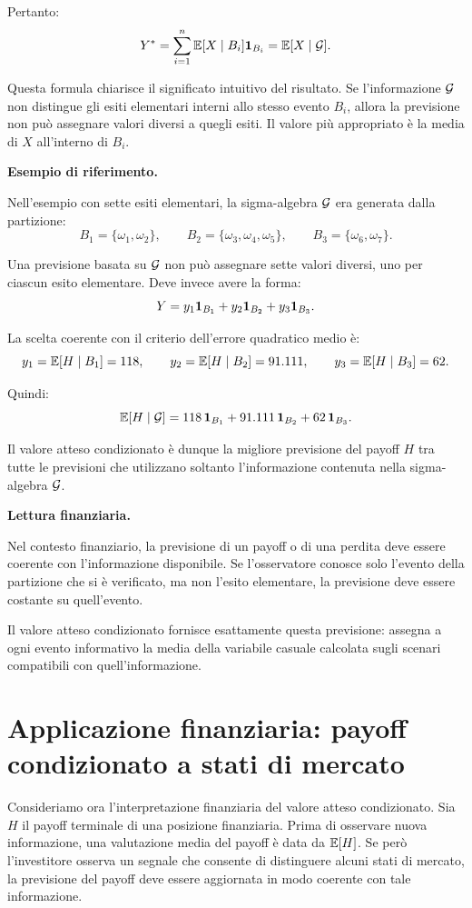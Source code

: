 Pertanto:
\[
Y^*
=
\sum_{i=1}^{n}
\mathbb{E}[X\mid B_i]\mathbf{1}_{B_i}
=
\mathbb{E}[X\mid\mathcal{G}].
\]

Questa formula chiarisce il significato intuitivo del risultato. Se
l'informazione $\mathcal{G}$ non distingue gli esiti elementari interni allo
stesso evento $B_i$, allora la previsione non pu\`{o} assegnare valori diversi
a quegli esiti. Il valore pi\`{u} appropriato \`{e} la media di $X$ all'interno
di $B_i$.

\medskip

\noindent
\textbf{Esempio di riferimento.}

Nell'esempio con sette esiti elementari, la sigma-algebra $\mathcal{G}$ era
generata dalla partizione:
\[
B_1=\{\omega_1,\omega_2\},
\qquad
B_2=\{\omega_3,\omega_4,\omega_5\},
\qquad
B_3=\{\omega_6,\omega_7\}.
\]

Una previsione basata su $\mathcal{G}$ non pu\`{o} assegnare sette valori
diversi, uno per ciascun esito elementare. Deve invece avere la forma:
\[
Y
=
y_1\mathbf{1}_{B_1}
+
y_2\mathbf{1}_{B_2}
+
y_3\mathbf{1}_{B_3}.
\]

La scelta coerente con il criterio dell'errore quadratico medio \`{e}:
\[
y_1=\mathbb{E}[H\mid B_1]=118,
\qquad
y_2=\mathbb{E}[H\mid B_2]=91.111,
\qquad
y_3=\mathbb{E}[H\mid B_3]=62.
\]

Quindi:
\[
\mathbb{E}[H\mid\mathcal{G}]
=
118\,\mathbf{1}_{B_1}
+
91.111\,\mathbf{1}_{B_2}
+
62\,\mathbf{1}_{B_3}.
\]

Il valore atteso condizionato \`{e} dunque la migliore previsione del payoff
$H$ tra tutte le previsioni che utilizzano soltanto l'informazione contenuta
nella sigma-algebra $\mathcal{G}$.

\medskip

\noindent
\textbf{Lettura finanziaria.}

Nel contesto finanziario, la previsione di un payoff o di una perdita deve
essere coerente con l'informazione disponibile. Se l'osservatore conosce solo
l'evento della partizione che si \`{e} verificato, ma non l'esito elementare,
la previsione deve essere costante su quell'evento.

Il valore atteso condizionato fornisce esattamente questa previsione: assegna
a ogni evento informativo la media della variabile casuale calcolata sugli
scenari compatibili con quell'informazione.

\section{Applicazione finanziaria: payoff condizionato a stati di mercato}

Consideriamo ora l'interpretazione finanziaria del valore atteso condizionato.
Sia $H$ il payoff terminale di una posizione finanziaria. Prima di osservare
nuova informazione, una valutazione media del payoff \`{e} data da
$\mathbb{E}[H]$. Se per\`{o} l'investitore osserva un segnale che consente di
distinguere alcuni stati di mercato, la previsione del payoff deve essere
aggiornata in modo coerente con tale informazione.

